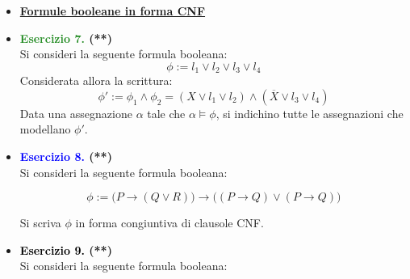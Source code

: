 \documentclass[a4paper,10pt]{article}
\begin{document}
    {\normalsize
    \begin{itemize}[label=, leftmargin=0pt]
    

    
    

    
    \item \textbf{\underline{Formule booleane in forma CNF}}
    
    \item \textbf{\textcolor{ForestGreen}{Esercizio 7.} (**)}\\ 	
    Si consideri la seguente formula booleana:
    $$\phi:= l_1\lor l_2 \lor l_3 \lor l_4$$
    Considerata allora la scrittura:
    $$\phi':=\phi_1\land \phi_2 = (X\lor l_1\lor l_2)\land(\overline{X} \lor l_3\lor l_4)$$
    Data una assegnazione $\alpha$ tale che $\alpha \models \phi$, si indichino tutte le assegnazioni che modellano $\phi'$.


    \item \textbf{\textcolor{blue}{Esercizio 8.} (**)}\\ 	
    Si consideri la seguente formula booleana:

    $$\phi:= \bigg(P \rightarrow (Q\lor R)\bigg)\rightarrow \bigg( (P\rightarrow Q) \lor (P\rightarrow Q) \bigg)$$
    
    Si scriva $\phi$ in forma congiuntiva di clausole CNF.
    
    \item \textbf{\textcolor{black}{Esercizio 9.} (**)}\\ 	
    Si consideri la seguente formula booleana:


\end{itemize}}
\end{document}
